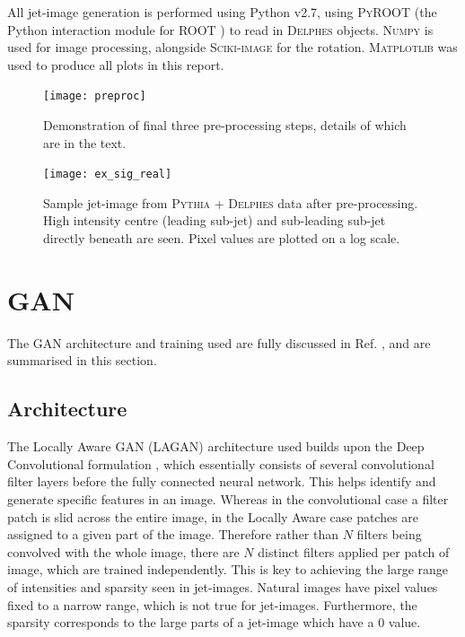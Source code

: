 \documentclass{report}
\newcommand{\pkg}[1]{\textsc{#1}}
\begin{document}
All jet-image generation is performed using Python v2.7, using \pkg{PyROOT} (the Python interaction module for \pkg{ROOT} \cite{root}) to read in \pkg{Delphes} objects. \pkg{Numpy} \cite{numpy} is used for image processing, alongside \pkg{Sciki-image} \cite{skimage} for the rotation. \pkg{Matplotlib} \cite{matplotlib} was used to produce all plots in this report.

\begin{figure}[H]
	\centering
	\texttt{[image: preproc]}
	
	\caption{Demonstration of final three pre-processing steps, details of which are in the text.}
	\label{fig:preproc}
	
\end{figure}

\begin{figure}[H]
	\centering
	\texttt{[image: ex\_sig\_real]}
	
	\caption{Sample jet-image from \pkg{Pythia} + \pkg{Delphes} data after pre-processing. High intensity centre (leading sub-jet) and sub-leading sub-jet directly beneath are seen. Pixel values are plotted on a log scale.}
	\label{fig:ex_sig_real}
	
\end{figure}

\section{GAN}
The GAN architecture and training used are fully discussed in Ref. \cite{de2017learning}, and are summarised in this section.
 
\subsection{Architecture}
The Locally Aware GAN (LAGAN) architecture used builds upon the Deep Convolutional formulation \cite{Radford2015}, which essentially consists of several convolutional filter layers before the fully connected neural network. This helps identify and generate specific features in an image. Whereas in the convolutional case a filter patch is slid across the entire image, in the Locally Aware case patches are assigned to a given part of the image. Therefore rather than $N$ filters being convolved with the whole image, there are $N$ distinct filters applied per patch of image, which are trained independently. This is key to achieving the large range of intensities and sparsity seen in jet-images. Natural images have pixel values fixed to a narrow range, which is not true for jet-images. Furthermore, the sparsity corresponds to the large parts of a jet-image which have a 0 value. \\
\end{document}
